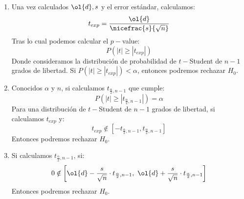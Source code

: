 \begin{enumerate}
    \item Una vez calculados $\ol{d},s$ y el error estándar, calculamos:
        \begin{equation*}
            t_{exp} = \dfrac{\ol{d}}{\nicefrac{s}{\sqrt{n}}}
        \end{equation*}
        Tras lo cual podemos calcular el $p-$value:
        \begin{equation*}
            P(|t| \geq |t_{exp}|)
        \end{equation*}
        Donde consideramos la distribución de probabilidad de $t-$Student de $n-1$ grados de libertad. Si $P(|t|\geq |t_{exp}|) < \alpha$, entonces podremos rechazar $H_0$.
    \item Conocidos $\alpha$ y $n$, si calculamos $t_{\frac{\alpha}{2},n-1}$ que cumple:
        \begin{equation*}
            P(|t| \geq |t_{\frac{\alpha}{2},n-1}|) = \alpha
        \end{equation*}
        Para una distribución de $t-$Student de $n-1$ grados de libertad, si calculamos $t_{exp}$ y:
        \begin{equation*}
            t_{exp} \notin \left[-t_{\frac{\alpha}{2},n-1}, t_{\frac{\alpha}{2},n-1}\right]
        \end{equation*}
        Entonces podremos rechazar $H_0$.
    \item Si calculamos $t_{\frac{\alpha}{2},n-1}$, si:
        \begin{equation*}
            0\notin \left[\ol{d}-\frac{s}{\sqrt{n}} \cdot t_{\frac{\alpha}{2},n-1},~\ol{d}+\frac{s}{\sqrt{n}} \cdot t_{\frac{\alpha}{2},n-1}\right]
        \end{equation*}
        Entonces podremos rechazar $H_0$.
\end{enumerate}

